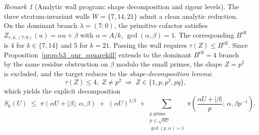 \documentclass[11pt]{article}
\renewcommand{\_}{\origunderscore\allowbreak}
\theoremstyle{definition}
\theoremstyle{remark}
\newtheorem{remark}[theorem]{Remark}
\begin{document}
\begin{remark}[Analytic wall program: shape decomposition and rigour levels]\label{rem:analytic_wall_program}
The three stratum-invariant walls $W=\{7,14,21\}$ admit a clean
analytic reduction.  On the dominant branch $\lambda=(7:0)$, the
primitive cofactor satisfies
$Z_{r,k,(7:0)}(u)=\alpha u+\beta$ with
$\alpha=A/k$, $\gcd(\alpha,\beta)=1$.  The corresponding $B^{\mathrm{eff}}$
is $4$ for $k\in\{7,14\}$ and $5$ for $k=21$.  Passing the wall
requires $\tau(Z)\le B^{\mathrm{eff}}$.  Since Proposition~\ref{prop:b3_qnr_squarekill}
extends to the dominant $B^{\mathrm{eff}}=4$ branch by the same
residue obstruction on $\beta$ modulo the small primes, the shape
$Z=p^{2}$ is excluded, and the target reduces to the
\emph{shape-decomposition lemma}:
\[
  \tau(Z)\le 4,\;Z\ne p^{2}\;\Longrightarrow\;Z\in\{1,p,p^{3},pq\},
\]
which yields the explicit decomposition
\[
  S_{k}(U)\;\le\;\pi(\alpha U+|\beta|;\,\alpha,\beta)
  \;+\;(\alpha U)^{1/3}
  \;+\!\!\sum_{\substack{p\text{ prime}\\p\le\sqrt{\alpha U}\\\gcd(p,\alpha)=1}}\pi\!\left(\frac{\alpha U+|\beta|}{p};\,\alpha,\beta p^{-1}\right)\!.
\]


\end{remark}
\end{document}
